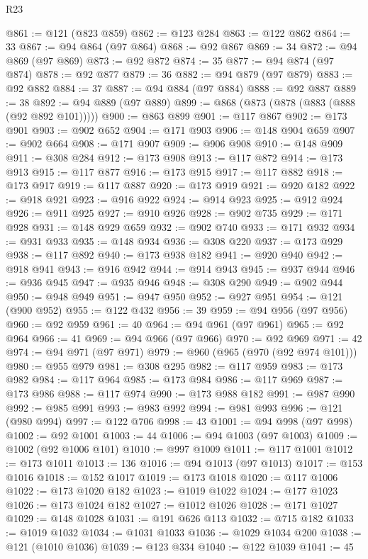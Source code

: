 \begin{lexlean}{R23}
\begin{coremodule}
@861 := @121 (@823 @859)
@862 := @123 @284
@863 := @122 @862
@864 := 33
@867 := @94 @864 (@97 @864)
@868 := @92 @867
@869 := 34
@872 := @94 @869 (@97 @869)
@873 := @92 @872
@874 := 35
@877 := @94 @874 (@97 @874)
@878 := @92 @877
@879 := 36
@882 := @94 @879 (@97 @879)
@883 := @92 @882
@884 := 37
@887 := @94 @884 (@97 @884)
@888 := @92 @887
@889 := 38
@892 := @94 @889 (@97 @889)
@899 := @868 (@873 (@878 (@883 (@888 (@92 @892 @101)))))
@900 := @863 @899
@901 := @117 @867
@902 := @173 @901
@903 := @902 @652
@904 := @171 @903
@906 := @148 @904 @659
@907 := @902 @664
@908 := @171 @907
@909 := @906 @908
@910 := @148 @909
@911 := @308 @284
@912 := @173 @908
@913 := @117 @872
@914 := @173 @913
@915 := @117 @877
@916 := @173 @915
@917 := @117 @882
@918 := @173 @917
@919 := @117 @887
@920 := @173 @919
@921 := @920 @182
@922 := @918 @921
@923 := @916 @922
@924 := @914 @923
@925 := @912 @924
@926 := @911 @925
@927 := @910 @926
@928 := @902 @735
@929 := @171 @928
@931 := @148 @929 @659
@932 := @902 @740
@933 := @171 @932
@934 := @931 @933
@935 := @148 @934
@936 := @308 @220
@937 := @173 @929
@938 := @117 @892
@940 := @173 @938 @182
@941 := @920 @940
@942 := @918 @941
@943 := @916 @942
@944 := @914 @943
@945 := @937 @944
@946 := @936 @945
@947 := @935 @946
@948 := @308 @290
@949 := @902 @944
@950 := @948 @949
@951 := @947 @950
@952 := @927 @951
@954 := @121 (@900 @952)
@955 := @122 @432
@956 := 39
@959 := @94 @956 (@97 @956)
@960 := @92 @959
@961 := 40
@964 := @94 @961 (@97 @961)
@965 := @92 @964
@966 := 41
@969 := @94 @966 (@97 @966)
@970 := @92 @969
@971 := 42
@974 := @94 @971 (@97 @971)
@979 := @960 (@965 (@970 (@92 @974 @101)))
@980 := @955 @979
@981 := @308 @295
@982 := @117 @959
@983 := @173 @982
@984 := @117 @964
@985 := @173 @984
@986 := @117 @969
@987 := @173 @986
@988 := @117 @974
@990 := @173 @988 @182
@991 := @987 @990
@992 := @985 @991
@993 := @983 @992
@994 := @981 @993
@996 := @121 (@980 @994)
@997 := @122 @706
@998 := 43
@1001 := @94 @998 (@97 @998)
@1002 := @92 @1001
@1003 := 44
@1006 := @94 @1003 (@97 @1003)
@1009 := @1002 (@92 @1006 @101)
@1010 := @997 @1009
@1011 := @117 @1001
@1012 := @173 @1011
@1013 := 136
@1016 := @94 @1013 (@97 @1013)
@1017 := @153 @1016
@1018 := @152 @1017
@1019 := @173 @1018
@1020 := @117 @1006
@1022 := @173 @1020 @182
@1023 := @1019 @1022
@1024 := @177 @1023
@1026 := @173 @1024 @182
@1027 := @1012 @1026
@1028 := @171 @1027
@1029 := @148 @1028
@1031 := @191 @626 @113
@1032 := @715 @182
@1033 := @1019 @1032
@1034 := @1031 @1033
@1036 := @1029 @1034 @200
@1038 := @121 (@1010 @1036)
@1039 := @123 @334
@1040 := @122 @1039
@1041 := 45

\end{coremodule}
\end{lexlean}

